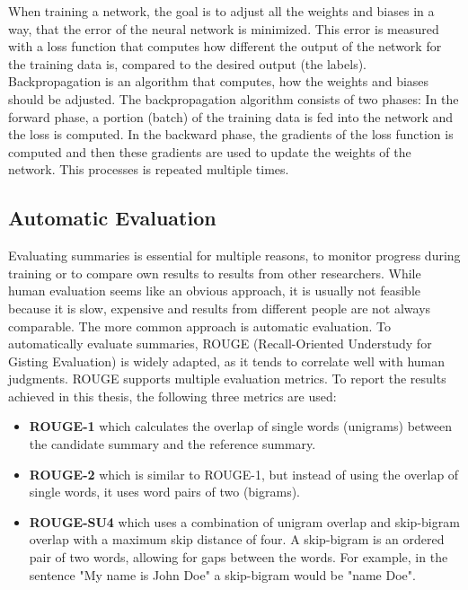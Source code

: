 When training a network, the goal is to adjust all the weights and biases in a way, that the error of the neural network is minimized.
This error is measured with a loss function that computes how different the output of the network for the training data is, compared to the desired output (the labels).
Backpropagation is an algorithm that computes, how the weights and biases should be adjusted.
The backpropagation algorithm consists of two phases: In the forward phase, a portion (batch) of the training data is fed into the network and the loss is computed.
In the backward phase, the gradients of the loss function is computed and then these gradients are used to update the weights of the network.
This processes is repeated multiple times.
\cite[p.~21--24]{Aggarwal2018}


\subsection{Automatic Evaluation}\label{ssec:automatic-evaluation}

Evaluating summaries is essential for multiple reasons, \eg to monitor progress during training or to compare own results to results from other researchers.
While human evaluation seems like an obvious approach, it is usually not feasible because it is slow, expensive and results from different people are not always comparable.
The more common approach is automatic evaluation.
To automatically evaluate summaries, ROUGE (Recall-Oriented Understudy for Gisting Evaluation) \cite{lin-2004-rouge} is widely adapted, as it tends to correlate well with human judgments.
ROUGE supports multiple evaluation metrics.
To report the results achieved in this thesis, the following three metrics are used:
\begin{itemize}
\item \textbf{ROUGE-1} which calculates the overlap of single words (unigrams) between the candidate summary and the reference summary. 
\item \textbf{ROUGE-2} which is similar to ROUGE-1, but instead of using the overlap of single words, it uses word pairs of two (bigrams).
\item \textbf{ROUGE-SU4} which uses a combination of unigram overlap and skip-bigram overlap with a maximum skip distance of four.
A skip-bigram is an ordered pair of two words, allowing for gaps between the words.
For example, in the sentence "My name is John Doe" a skip-bigram would be "name Doe".
\end{itemize}

